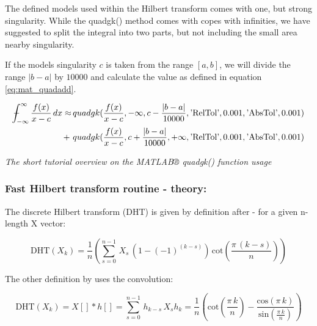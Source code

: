 \documentclass[12pt,twoside,a4paper]{article}
\numberwithin{equation}{subsection}
\numberwithin{figure}{subsection}
\def\Xint#1{\mathchoice
{\XXint\displaystyle\textstyle{#1}}%
{\XXint\textstyle\scriptstyle{#1}}%
{\XXint\scriptstyle\scriptscriptstyle{#1}}%
{\XXint\scriptscriptstyle\scriptscriptstyle{#1}}%
\!\int}
\def\XXint#1#2#3{{\setbox0=\hbox{$#1{#2#3}{\int}$ }\vcenter{\hbox{$#2#3$ }}\kern-.6\wd0}}
\def\dashint{\Xint-}
\begin{document}
The defined models used within the Hilbert transform comes with one, but strong singularity. While the quadgk() method comes with
copes with infinities, we have suggested to split the integral into two parts, but not including the small area nearby singularity.

If the models singularity $c$ is taken from the range $[a, b]$, we will divide the range $|b-a|$ by $10000$ and calculate the value
as defined in equation \ref{eq:mat_quadadd}. 
 
\begin{alignat}{1} \label{eq:mat_quadadd}
  \dashint_{ - \infty }^{\infty } \frac {f(x)}{x-c} \, dx \approx 
          & \, quadgk(\frac {f(x)}{x-c}, - \infty, c - \frac{|b-a|}{10000}, \text{'RelTol'}, 0.001, \text{'AbsTol'}, 0.001 ) \\
     + \, & \, quadgk(\frac {f(x)}{x-c}, c + \frac{|b-a|}{10000}, + \infty, \text{'RelTol'}, 0.001, \text{'AbsTol'}, 0.001 )
     \nonumber
\end{alignat}
 


\textit{The short tutorial overview on the MATLAB® quadgk() function usage}

\subsubsection*{Fast Hilbert transform routine - theory:}

The discrete Hilbert transform (DHT) is given by definition after \cite{kak_multilayeredarray} - for a given n-length X vector:

\begin{equation} \label{eq:matlab_fhttheroy}
  \mathrm{DHT}({X_{k}})=\frac {1}{n} \left(  \! \sum_{s=0}^{n - 1}\,{X _{s}}\,(1 - ( - 1)^{(k - s)})\,\mathrm{cot}(\frac {\pi \,(k
  - s) }{n}) \!  \right) 
\end{equation}

The other definition by \cite{calvetti_computation} uses the convolution:

\begin{subequations} \label{eq:matlab_convolution}
  \begin{equation}   \label{eq:mconv_dht}
    \mathrm{DHT}({X_{k}})  = X[] * h[] = \sum_{s=0}^{n - 1}\,{h_{k - s}}\,{X_{s}}
  \end{equation}
  \begin{equation}   \label{eq:mconv_hk}
    {h_{k}}=\frac {1}{n} \left(  \! \mathrm{cot}(\frac {\pi \,k}{n}) - \frac {\mathrm{cos}(\pi \,k)}{\mathrm{sin}(\frac {\pi
    \,k}{n})}\! \right) 
  \end{equation}
\end{subequations}
\end{document}
